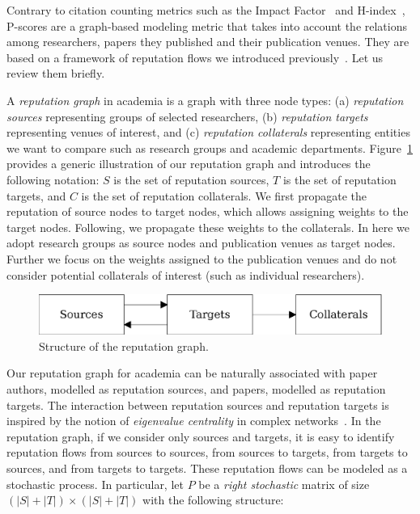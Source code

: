 \documentclass[man]{apa6}
\begin{document}
Contrary to citation counting metrics such as the Impact 
Factor~\cite{Garfield1955a, Saha2003, Thomson2017, Balaban2012} and 
H-index~\cite{Benevenuto2016, Bar-Ilan2008, Egghe2008, Bornmann2005, Bornmann2011}, 
P-scores are a graph-based modeling metric that takes into account 
the relations among researchers, papers they published and their publication venues. They are 
based on a framework of reputation flows we introduced previously~\cite{Ribas2015}. Let us review 
them briefly. 

A \emph{reputation graph} in academia is a graph with three node types: (a) {\em reputation sources} representing groups of selected researchers, 
(b) {\em reputation targets} representing venues of interest, and
(c) {\em reputation collaterals} representing entities we want to compare such as research groups and academic 
departments. 
Figure~\ref{fig:overview} provides a generic illustration of our reputation graph and introduces the following 
notation: $S$ is the set of reputation sources, $T$ is the set of reputation targets, and $C$ is the set of reputation collaterals.
We first propagate the reputation of source nodes to target nodes, which allows assigning 
weights to the target nodes. Following, we propagate these weights to the collaterals. 
In here we adopt research groups as source nodes and publication venues as target nodes. 
Further we focus on the weights assigned to the publication venues and do not consider 
potential collaterals of interest (such as individual researchers). 

\begin{figure}[h]
   \centerline{\includegraphics[scale=0.75]{figures/overview-line}}
   \caption{Structure of the reputation graph.}
   \label{fig:overview}
\end{figure}

Our reputation graph for academia can be naturally associated with paper authors, 
modelled as reputation sources, and papers, modelled as reputation targets. 
The interaction between reputation sources and reputation targets is inspired by the 
notion of {\em eigenvalue centrality} in complex 
networks~\cite{Brin1998, Langville2008, Langville2008, Newman2010}. 
In the reputation graph, if we consider only sources and targets, it is easy to 
identify reputation flows from sources to sources, from sources to targets, from 
targets to sources, and from targets to targets. These reputation flows can be 
modeled as a stochastic process. 
In particular, let $P$ be a \emph{right stochastic} %
matrix of size $(|S|+|T|) \times (|S|+|T|)$ with the following structure: 
\end{document}
